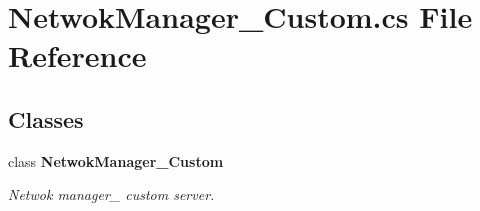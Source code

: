 \section{Netwok\+Manager\+\_\+\+Custom.\+cs File Reference}
\label{_netwok_manager___custom_8cs}
\subsection*{Classes}
\begin{DoxyCompactItemize}
\item 
class {\bf Netwok\+Manager\+\_\+\+Custom}
\begin{DoxyCompactList}\small\item\em Netwok manager\+\_\+ custom server. \end{DoxyCompactList}\end{DoxyCompactItemize}
